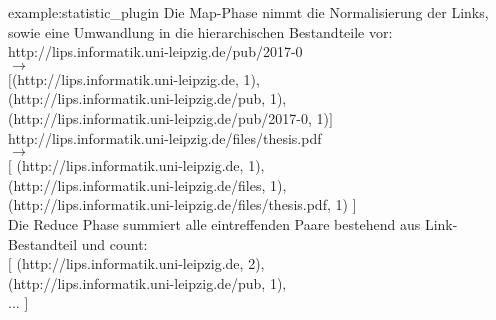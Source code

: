 \begin{example}{example:statistic_plugin}
Die Map-Phase nimmt die Normalisierung der Links, sowie eine Umwandlung in die hierarchischen Bestandteile vor:\\

http://lips.informatik.uni-leipzig.de/pub/2017-0\\
$\rightarrow$ \\
$[$(http://lips.informatik.uni-leipzig.de, 1),\\
(http://lips.informatik.uni-leipzig.de/pub, 1),\\
(http://lips.informatik.uni-leipzig.de/pub/2017-0, 1)$]$\\

http://lips.informatik.uni-leipzig.de/files/thesis.pdf\\
$\rightarrow$\\
$[$
(http://lips.informatik.uni-leipzig.de, 1), \\
(http://lips.informatik.uni-leipzig.de/files, 1), \\
(http://lips.informatik.uni-leipzig.de/files/thesis.pdf, 1)
$]$\\

Die Reduce Phase summiert alle eintreffenden Paare bestehend aus Link-Bestandteil und count:\\

$[$
(http://lips.informatik.uni-leipzig.de, 2), \\
(http://lips.informatik.uni-leipzig.de/pub, 1), \\
...
$]$
\end{example}
